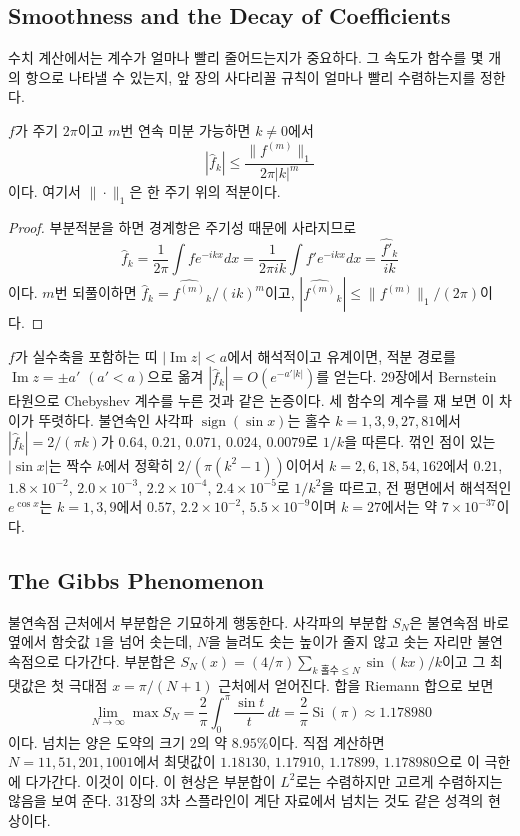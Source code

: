 \subsection{Smoothness and the Decay of Coefficients}

수치 계산에서는 계수가 얼마나 빨리 줄어드는지가 중요하다. 그 속도가 함수를 몇 개의 항으로 나타낼 수 있는지, 앞 장의 사다리꼴 규칙이 얼마나 빨리 수렴하는지를 정한다.

\begin{proposition}
\label{prop:fourier-decay}
$f$가 주기 $2\pi$이고 $m$번 연속 미분 가능하면 $k\ne0$에서
\[
|\hat f_k|\le\frac{\|f^{(m)}\|_1}{2\pi|k|^m}
\]
이다. 여기서 $\|\cdot\|_1$은 한 주기 위의 적분이다.
\end{proposition}

\begin{proof}
부분적분을 하면 경계항은 주기성 때문에 사라지므로
\[
\hat f_k=\frac1{2\pi}\int fe^{-ikx}dx=\frac1{2\pi ik}\int f'e^{-ikx}dx=\frac{\widehat{f'}_k}{ik}
\]
이다. $m$번 되풀이하면 $\hat f_k=\widehat{f^{(m)}}_k/(ik)^m$이고, $|\widehat{f^{(m)}}_k|\le\|f^{(m)}\|_1/(2\pi)$이다.
\end{proof}

$f$가 실수축을 포함하는 띠 $|\operatorname{Im}z|<a$에서 해석적이고 유계이면, 적분 경로를 $\operatorname{Im}z=\pm a'$ $(a'<a)$으로 옮겨 $|\hat f_k|=O(e^{-a'|k|})$를 얻는다. 29장에서 Bernstein 타원으로 Chebyshev 계수를 누른 것과 같은 논증이다. 세 함수의 계수를 재 보면 이 차이가 뚜렷하다. 불연속인 사각파 $\operatorname{sign}(\sin x)$는 홀수 $k=1,3,9,27,81$에서 $|\hat f_k|=2/(\pi k)$가 $0.64$, $0.21$, $0.071$, $0.024$, $0.0079$로 $1/k$을 따른다. 꺾인 점이 있는 $|\sin x|$는 짝수 $k$에서 정확히 $2/(\pi(k^2-1))$이어서 $k=2,6,18,54,162$에서 $0.21$, $1.8\times10^{-2}$, $2.0\times10^{-3}$, $2.2\times10^{-4}$, $2.4\times10^{-5}$로 $1/k^2$을 따르고, 전 평면에서 해석적인 $e^{\cos x}$는 $k=1,3,9$에서 $0.57$, $2.2\times10^{-2}$, $5.5\times10^{-9}$이며 $k=27$에서는 약 $7\times10^{-37}$이다.

\subsection{The Gibbs Phenomenon}

불연속점 근처에서 부분합은 기묘하게 행동한다. 사각파의 부분합 $S_N$은 불연속점 바로 옆에서 함숫값 $1$을 넘어 솟는데, $N$을 늘려도 솟는 높이가 줄지 않고 솟는 자리만 불연속점으로 다가간다. 부분합은 $S_N(x)=(4/\pi)\sum_{k\text{ 홀수}\le N}\sin(kx)/k$이고 그 최댓값은 첫 극대점 $x=\pi/(N+1)$ 근처에서 얻어진다. 합을 Riemann 합으로 보면
\[
\lim_{N\to\infty}\max S_N=\frac2\pi\int_0^\pi\frac{\sin t}t\,dt=\frac2\pi\operatorname{Si}(\pi)\approx1.178980
\]
이다. 넘치는 양은 도약의 크기 $2$의 약 $8.95\%$이다. 직접 계산하면 $N=11,51,201,1001$에서 최댓값이 $1.18130$, $1.17910$, $1.17899$, $1.178980$으로 이 극한에 다가간다. 이것이 이다. 이 현상은 부분합이 $L^2$로는 수렴하지만 고르게 수렴하지는 않음을 보여 준다. 31장의 3차 스플라인이 계단 자료에서 넘치는 것도 같은 성격의 현상이다.

